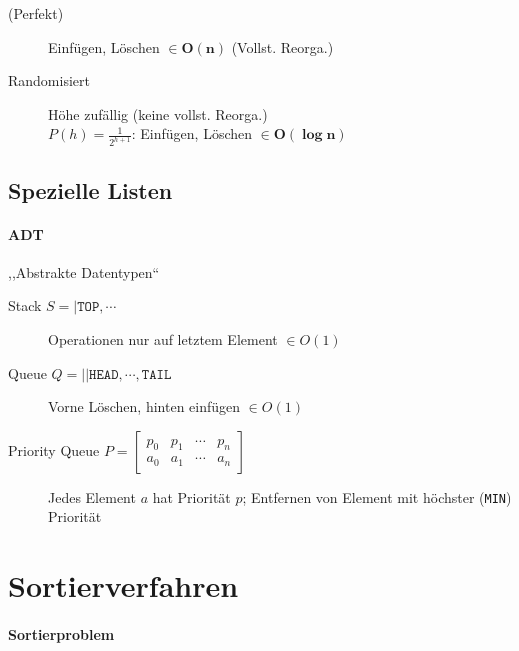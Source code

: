 \begin{description}
  \item [(Perfekt)]
        Einfügen, Löschen $\mathbf{\in O(n)}$ (Vollst. Reorga.)

  \item [Randomisiert]
        Höhe zufällig (keine vollst. Reorga.) \\
        $P(h) = \frac{1}{2^{h + 1}}$: Einfügen, Löschen $\mathbf{\in O(\log n)}$
\end{description}

\subsection{Spezielle Listen}

\paragraph{ADT} ,,Abstrakte Datentypen``

\begin{description}
  \item [Stack $S = | \texttt{TOP}, \cdots$]
        Operationen nur auf letztem Element $\in O(1)$

  \item [Queue $Q = || \texttt{HEAD}, \cdots, \texttt{TAIL}$]
        Vorne Löschen, hinten einfügen $\in O(1)$

  \item [Priority Queue $P = \begin{bmatrix}
            p_0 & p_1 & \cdots & p_n \\
            a_0 & a_1 & \cdots & a_n
          \end{bmatrix}$]
        Jedes Element $a$ hat Priorität $p$; Entfernen von Element mit höchster (\texttt{MIN}) Priorität
\end{description}

\section{Sortierverfahren}

\paragraph{Sortierproblem}

